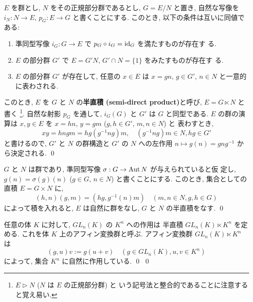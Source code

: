\documentclass[12pt,twoside]{jarticle}
\def\nsup{\triangleright}
\def\Aut{\mathop{\text{\rm Aut}}\nolimits}
\def\id{\text{\rm id}}
\begin{document}
\begin{question}[半直積]
  $E$ を群とし, $N$ をその正規部分群であるとし, $G=E/N$ と置き,
  自然な写像を $i_N:N\to E$, $p_G:E\to G$ と書くことにする.
  このとき, 以下の条件は互いに同値である:
  \begin{enumerate}
  \item 準同型写像 $i_G:G\to E$ で $p_G\circ i_G=\id_G$ を満たすものが存在す
    る.
  \item $E$ の部分群 $G'$ で $E=G'N$, $G'\cap N=\{1\}$ をみたすものが存在す
    る. 
  \item $E$ の部分群 $G'$ が存在して, 任意の $x\in E$ は $x=gn$, 
    $g\in G'$, $n\in N$ と一意的に表わされる.
  \end{enumerate}
  このとき, $E$ を $G$ と $N$ の{\bf 半直積 (semi-direct product)}と呼び,
  $E = G\ltimes N$ と書く%
  \footnote{$E\nsup N$ ($N$ は $E$ の正規部分群) と
  いう記号法と整合的であることに注意すると覚え易い.}. %
  自然な射影 $p_G$ を通して, $i_G(G)$ と $G'$ は $G$ と同型である.
  $E$ の群の演算は $x,y\in E$ を $x=hn$, $y=gm$ ($g,h\in G'$, $m,n\in N$) と
  表わすとき,
  \begin{equation*}
    xy = hngm = hg(g^{-1}ng)m,
    \quad (g^{-1}ng)m\in N, hg\in G'
  \end{equation*}
  と書けるので, $G'$ と $N$ の群構造と %
  $G'$ の $N$ への左作用 $n\mapsto g(n) = gng^{-1}$ から決定される.
  \qed
\end{question}

\begin{question}[半直積の作り方]
  $G$ と $N$ は群であり, 準同型写像 $\sigma:G\to\Aut N$ が与えられていると仮
  定し, $g(n) = \sigma(g)(n)$ ($g\in G$, $n\in N$) と書くことにする. 
  このとき, 集合としての直積 $E=G\times N$ に,
  \begin{equation*}
    (h,n)(g,m) = (hg, g^{-1}(n)m)
    \quad (m,n\in N, g,h\in G)
  \end{equation*}
  によって積を入れると, $E$ は自然に群をなし, $G$ と $N$ の半直積をなす.
  \qed
\end{question}

\begin{question}[アフィン変換群]
  任意の体 $K$ に対して, $GL_n(K)$ の $K^n$ への作用は
  半直積 $GL_n(K)\ltimes K^n$ を定める. 
  これを体 $K$ 上のアフィン変換群と呼ぶ.
  アフィン変換群 $GL_n(K)\ltimes K^n$ は
  \begin{equation*}
    (g, u) v := g(u + v)
    \quad (g\in GL_n(K), u,v\in K^n)
  \end{equation*}
  によって, 集合 $K^n$ に自然に作用している. \qed
  \qed
\end{question}
\end{document}

